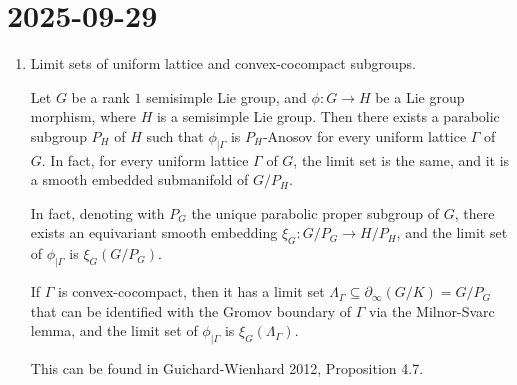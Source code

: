 \documentclass{report}
\begin{document}
\section{2025-09-29}
\begin{enumerate}
    \item Limit sets of uniform lattice and convex-cocompact subgroups.
    
    Let $G$ be a rank $1$ semisimple Lie group, and $\phi: G \to H$ be a Lie group morphism, where $H$ is a semisimple Lie group.
    Then there exists a parabolic subgroup $P_H$ of $H$ such that $\phi_{\mid \Gamma}$ is $P_H$-Anosov for every uniform lattice $\Gamma$ of $G$.
    In fact, for every uniform lattice $\Gamma$ of $G$, the limit set is the same, and it is a smooth embedded submanifold of $G/P_H$.

    In fact, denoting with $P_G$ the unique parabolic proper subgroup of $G$, there exists an equivariant smooth embedding $\xi_G: G/P_G \to H/P_H$, and the limit set of $\phi_{\mid \Gamma}$ is $\xi_G(G/P_G)$.

    If $\Gamma$ is convex-cocompact, then it has a limit set $\Lambda_\Gamma \subseteq \partial_\infty (G/K) = G/P_G$ that can be identified with the Gromov boundary of $\Gamma$ via the Milnor-Svarc lemma, and the limit set of $\phi_{\mid \Gamma}$ is $\xi_G(\Lambda_\Gamma)$.

    This can be found in Guichard-Wienhard 2012, Proposition 4.7.
\end{enumerate}
\end{document}
